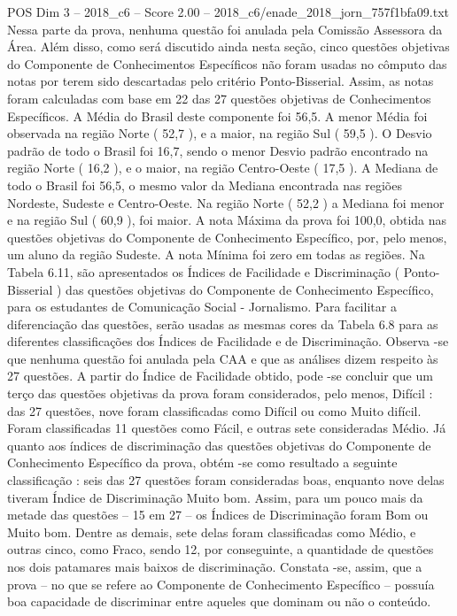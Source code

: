 \begin{textsample}{POS Dim 3 – 2018\_c6 – Score 2.00 – 2018\_c6/enade\_2018\_jorn\_757f1bfa09.txt}
Nessa parte da prova, nenhuma questão foi anulada pela Comissão Assessora da Área.
Além disso, como será discutido ainda nesta seção, cinco questões objetivas do Componente de Conhecimentos Específicos não foram usadas no cômputo das notas por terem sido descartadas pelo critério Ponto-Bisserial.
Assim, as notas foram calculadas com base em 22 das 27 questões objetivas de Conhecimentos Específicos.
A Média do Brasil deste componente foi 56,5.
A menor Média foi observada na região Norte ( 52,7 ), e a maior, na região Sul ( 59,5 ).
O Desvio padrão de todo o Brasil foi 16,7, sendo o menor Desvio padrão encontrado na região Norte ( 16,2 ), e o maior, na região Centro-Oeste ( 17,5 ).
A Mediana de todo o Brasil foi 56,5, o mesmo valor da Mediana encontrada nas regiões Nordeste, Sudeste e Centro-Oeste.
Na região Norte ( 52,2 ) a Mediana foi menor e na região Sul ( 60,9 ), foi maior.
A nota Máxima da prova foi 100,0, obtida nas questões objetivas do Componente de Conhecimento Específico, por, pelo menos, um aluno da região Sudeste.
A nota Mínima foi zero em todas as regiões.
Na Tabela 6.11, são apresentados os Índices de Facilidade e Discriminação ( Ponto-Bisserial ) das questões objetivas do Componente de Conhecimento Específico, para os estudantes de Comunicação Social - Jornalismo.
Para facilitar a diferenciação das questões, serão usadas as mesmas cores da Tabela 6.8 para as diferentes classificações dos Índices de Facilidade e de Discriminação.
Observa -se que nenhuma questão foi anulada pela CAA e que as análises dizem respeito às 27 questões.
A partir do Índice de Facilidade obtido, pode -se concluir que um terço das questões objetivas da prova foram considerados, pelo menos, Difícil : das 27 questões, nove foram classificadas como Difícil ou como Muito difícil.
Foram classificadas 11 questões como Fácil, e outras sete consideradas Médio.
Já quanto aos índices de discriminação das questões objetivas do Componente de Conhecimento Específico da prova, obtém -se como resultado a seguinte classificação : seis das 27 questões foram consideradas boas, enquanto nove delas tiveram Índice de Discriminação Muito bom.
Assim, para um pouco mais da metade das questões – 15 em 27 – os Índices de Discriminação foram Bom ou Muito bom.
Dentre as demais, sete delas foram classificadas como Médio, e outras cinco, como Fraco, sendo 12, por conseguinte, a quantidade de questões nos dois patamares mais baixos de discriminação.
Constata -se, assim, que a prova – no que se refere ao Componente de Conhecimento Específico – possuía boa capacidade de discriminar entre aqueles que dominam ou não o conteúdo.

\end{textsample}
